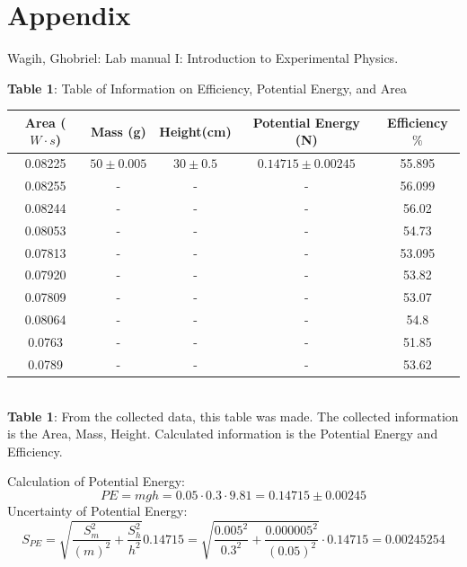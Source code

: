 \documentclass[11pt]{article}
\begin{document}
\section*{Appendix}
Wagih, Ghobriel: Lab manual I: Introduction to Experimental Physics.
\begin{center}
\caption{\textbf{Table 1}: Table of Information on Efficiency, Potential Energy, and Area} 
 \begin{tabular}{||c c c c c||} 
 \hline
 Area ($W\cdot s$) & Mass (g) & Height(cm) & Potential Energy (N) & Efficiency $\%$\\ [0.5ex] 
 \hline\hline
 0.08225 & $50\pm0.005$  & $30\pm0.5$ & $0.14715\pm0.00245$ & 55.895\\ 
 \hline
 0.08255 & - & - & - & 56.099 \\
 \hline
 0.08244 & - & - & - & 56.02\\
 \hline
 0.08053 & - & - & - & 54.73 \\
 \hline
 0.07813 & - & - & - & 53.095 \\
 \hline
 0.07920 & - & - & - & 53.82 \\
 \hline
 0.07809 & - & - & - & 53.07\\
 \hline
 0.08064 & - & - & - & 54.8\\
 \hline
 0.0763 & - & - & - & 51.85\\
 \hline
 0.0789 & - & - & - & 53.62 \\ [1ex] 
 \hline
\end{tabular}
\\\textbf{Table 1}: From the collected data, this table was made. The collected information is the Area, Mass, Height. Calculated information is the Potential Energy and Efficiency.
\end{center}
Calculation of Potential Energy:
\[PE=mgh=0.05\cdot 0.3\cdot 9.81=0.14715\pm 0.00245\]
Uncertainty of Potential Energy:
\[S_{PE}=\sqrt{\frac{S_m^2}{(m)^2}+\frac{S_h^2}{h^2}}0.14715=\sqrt{\frac{0.005^2}{0.3^2}+\frac{0.000005^2}{(0.05)^2}}\cdot 0.14715=0.00245254\]
\end{document}
